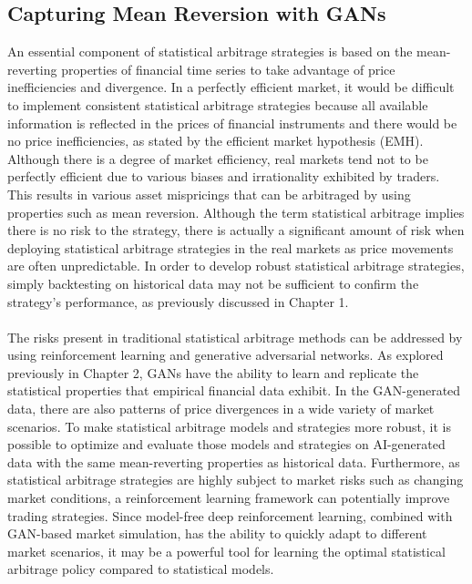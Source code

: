 \subsection{Capturing Mean Reversion with GANs}
An essential component of statistical arbitrage strategies is based on the mean-reverting properties of financial time series to take advantage of price inefficiencies and divergence. In a perfectly efficient market, it would be difficult to implement consistent statistical arbitrage strategies because all available information is reflected in the prices of financial instruments and there would be no price inefficiencies, as stated by the efficient market hypothesis (EMH). Although there is a degree of market efficiency, real markets tend not to be perfectly efficient due to various biases and irrationality exhibited by traders. This results in various asset mispricings that can be arbitraged by using properties such as mean reversion. Although the term statistical arbitrage implies there is no risk to the strategy, there is actually a significant amount of risk when deploying statistical arbitrage strategies in the real markets as price movements are often unpredictable. In order to develop robust statistical arbitrage strategies, simply backtesting on historical data may not be sufficient to confirm the strategy's performance, as previously discussed in Chapter 1.
\\ \\
The risks present in traditional statistical arbitrage methods can be addressed by using reinforcement learning and generative adversarial networks. As explored previously in Chapter 2, GANs have the ability to learn and replicate the statistical properties that empirical financial data exhibit. In the GAN-generated data, there are also patterns of price divergences in a wide variety of market scenarios. To make statistical arbitrage models and strategies more robust, it is possible to optimize and evaluate those models and strategies on AI-generated data with the same mean-reverting properties as historical data. Furthermore, as statistical arbitrage strategies are highly subject to market risks such as changing market conditions, a reinforcement learning framework can potentially improve trading strategies. Since model-free deep reinforcement learning, combined with GAN-based market simulation, has the ability to quickly adapt to different market scenarios, it may be a powerful tool for learning the optimal statistical arbitrage policy compared to statistical models.

